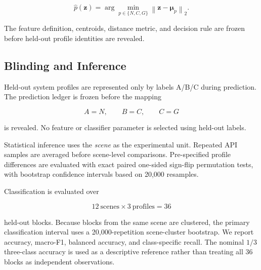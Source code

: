 \begin{equation}
\hat{p}(\mathbf{z})
=
\arg\min_{p\in\{N,C,G\}}
\left\|
\mathbf{z}-\boldsymbol{\mu}_{p}
\right\|_2.
\end{equation}

The feature definition, centroids, distance metric, and decision rule are
frozen before held-out profile identities are revealed.

\subsection{Blinding and Inference}

Held-out system profiles are represented only by labels A/B/C during
prediction. The prediction ledger is frozen before the mapping

\begin{equation}
A=N,\qquad B=C,\qquad C=G
\end{equation}

is revealed. No feature or classifier parameter is selected using
held-out labels.

Statistical inference uses the \emph{scene} as the experimental unit.
Repeated API samples are averaged before scene-level comparisons.
Pre-specified profile differences are evaluated with exact paired
one-sided sign-flip permutation tests, with bootstrap confidence
intervals based on 20,000 resamples.

Classification is evaluated over

\begin{equation}
12\ \mathrm{scenes}\times3\ \mathrm{profiles}=36
\end{equation}

held-out blocks. Because blocks from the same scene are clustered, the
primary classification interval uses a 20,000-repetition scene-cluster
bootstrap. We report accuracy, macro-F1, balanced accuracy, and
class-specific recall. The nominal \(1/3\) three-class accuracy is used
as a descriptive reference rather than treating all 36 blocks as
independent observations.
